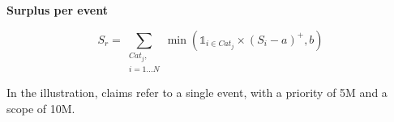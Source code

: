 \begin{f}
\textbf{Surplus per event}
	
	\[
	S_r= \sum_{\begin{array}{c}
			Cat_j,\\ i=1\ldots N
	\end{array}} \min\left( \mathds{1}_{i\in Cat_j}\times \left( S_i-a\right)^+,b\right)  
	\]
	
	In the illustration, claims refer to a single event, with a priority of 5M\EUR{} and a scope of 10M\EUR{}.
	


\end{f}
